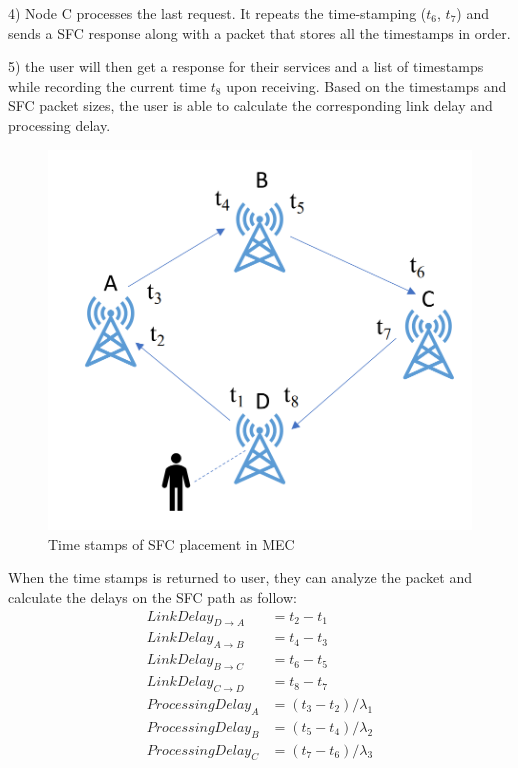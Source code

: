 4) Node C processes the last request. It repeats the time-stamping ($t_6$, $t_7$) and sends a SFC response along with a packet that stores all the timestamps in order.

5) the user will then get a response for their services and a list of timestamps while recording the current time $t_8$ upon receiving. Based on the timestamps and SFC packet sizes, the user is able to calculate the corresponding link delay and processing delay.

\begin{figure}
	\centering
	\includegraphics[width=0.9\linewidth]{figs/SFCtimestamp.PNG}
	\caption{Time stamps of SFC placement in MEC}
	\label{fig:timestampExample}
\end{figure}
When the time stamps is returned to user, they can analyze the packet and calculate the delays on the SFC path as follow:
\begin{equation}
	\label{eqn: timestampcalculation}
	\begin{aligned}
		LinkDelay_{D \rightarrow A} &= t_2 - t_1\\
		LinkDelay_{A \rightarrow B} &= t_4 - t_3\\
		LinkDelay_{B \rightarrow C} &= t_6 - t_5\\
		LinkDelay_{C \rightarrow D} &= t_8 - t_7\\
		ProcessingDelay_A           &= (t_3 - t_2)/\lambda_1\\
		ProcessingDelay_B           &= (t_5 - t_4)/\lambda_2\\
		ProcessingDelay_C           &= (t_7 - t_6)/\lambda_3\\
	\end{aligned}
\end{equation}

